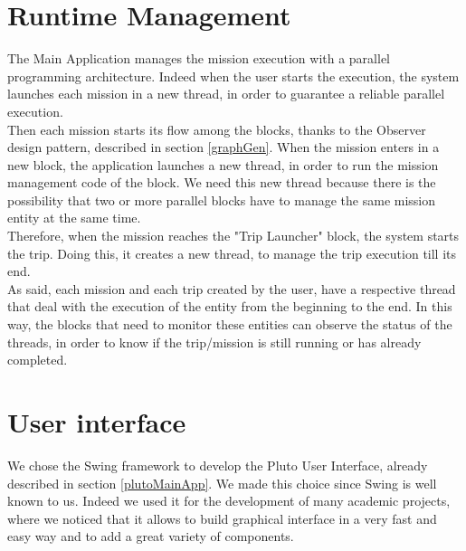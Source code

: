 \section{Runtime Management}\label{runtimeMng}

The Main Application manages the mission execution with a parallel programming architecture. 
Indeed when the user starts the execution, the system launches each mission in a new thread, in order to guarantee a reliable parallel execution.
\\

Then each mission starts its flow among the blocks, thanks to the Observer design pattern, described in section \ref{graphGen}.
When the mission enters in a new block, the application launches a new thread, in order to run the mission management code of the block.
We need this new thread because there is the possibility that two or more parallel blocks have to manage the same mission entity at the same time.
\\

Therefore, when the mission reaches the "Trip Launcher" block, the system starts the trip.
Doing this, it creates a new thread, to manage the trip execution till its end.
\\

As said, each mission and each trip created by the user, have a respective thread that deal with the execution of the entity from the beginning to the end. In this way, the blocks that need to monitor these entities can observe the status of the threads, in order to know if the trip/mission is still running or has already completed.
\\


\section{User interface}\label{interface}

We chose the Swing framework to develop the Pluto User Interface, already described in section \ref{plutoMainApp}.
We made this choice since Swing is well known to us.
Indeed we used it for the development of many academic projects, where we noticed that it allows to build graphical interface in a very fast and easy way and to add a great variety of components.
\\

